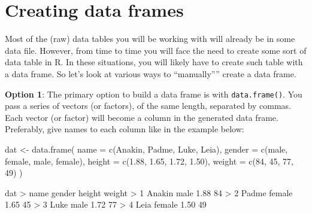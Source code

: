\documentclass[
]{book}
\newenvironment{Shaded}{\begin{snugshade}}{\end{snugshade}}
\newcommand{\AttributeTok}[1]{\textcolor[rgb]{0.77,0.63,0.00}{#1}}
\newcommand{\DecValTok}[1]{\textcolor[rgb]{0.00,0.00,0.81}{#1}}
\newcommand{\FloatTok}[1]{\textcolor[rgb]{0.00,0.00,0.81}{#1}}
\newcommand{\FunctionTok}[1]{\textcolor[rgb]{0.00,0.00,0.00}{#1}}
\newcommand{\NormalTok}[1]{#1}
\newcommand{\OtherTok}[1]{\textcolor[rgb]{0.56,0.35,0.01}{#1}}
\newcommand{\SpecialCharTok}[1]{\textcolor[rgb]{0.00,0.00,0.00}{#1}}
\newcommand{\StringTok}[1]{\textcolor[rgb]{0.31,0.60,0.02}{#1}}
\begin{document}
\hypertarget{creating-data-frames}{%
\section{Creating data frames}\label{creating-data-frames}}

Most of the (raw) data tables you will be working with will already be in
some data file. However, from time to time you will face the need to create
some sort of data table in R. In these situations, you will likely have to
create such table with a data frame. So let's look at various ways to
``manually'''' create a data frame.

\textbf{Option 1}: The primary option to build a data frame is with \texttt{data.frame()}.
You pass a series of vectors (or factors), of the same length, separated by commas.
Each vector (or factor) will become a column in the generated data frame.
Preferably, give names to each column like in the example below:

\begin{Shaded}
\begin{Highlighting}[]
\NormalTok{dat }\OtherTok{\textless{}{-}} \FunctionTok{data.frame}\NormalTok{(}
  \AttributeTok{name =} \FunctionTok{c}\NormalTok{(}\StringTok{\textquotesingle{}Anakin\textquotesingle{}}\NormalTok{, }\StringTok{\textquotesingle{}Padme\textquotesingle{}}\NormalTok{, }\StringTok{\textquotesingle{}Luke\textquotesingle{}}\NormalTok{, }\StringTok{\textquotesingle{}Leia\textquotesingle{}}\NormalTok{),}
  \AttributeTok{gender =} \FunctionTok{c}\NormalTok{(}\StringTok{\textquotesingle{}male\textquotesingle{}}\NormalTok{, }\StringTok{\textquotesingle{}female\textquotesingle{}}\NormalTok{, }\StringTok{\textquotesingle{}male\textquotesingle{}}\NormalTok{, }\StringTok{\textquotesingle{}female\textquotesingle{}}\NormalTok{),}
  \AttributeTok{height =} \FunctionTok{c}\NormalTok{(}\FloatTok{1.88}\NormalTok{, }\FloatTok{1.65}\NormalTok{, }\FloatTok{1.72}\NormalTok{, }\FloatTok{1.50}\NormalTok{),}
  \AttributeTok{weight =} \FunctionTok{c}\NormalTok{(}\DecValTok{84}\NormalTok{, }\DecValTok{45}\NormalTok{, }\DecValTok{77}\NormalTok{, }\DecValTok{49}\NormalTok{)}
\NormalTok{) }

\NormalTok{dat}
\SpecialCharTok{\textgreater{}}\NormalTok{     name gender height weight}
\SpecialCharTok{\textgreater{}} \DecValTok{1}\NormalTok{ Anakin   male   }\FloatTok{1.88}     \DecValTok{84}
\SpecialCharTok{\textgreater{}} \DecValTok{2}\NormalTok{  Padme female   }\FloatTok{1.65}     \DecValTok{45}
\SpecialCharTok{\textgreater{}} \DecValTok{3}\NormalTok{   Luke   male   }\FloatTok{1.72}     \DecValTok{77}
\SpecialCharTok{\textgreater{}} \DecValTok{4}\NormalTok{   Leia female   }\FloatTok{1.50}     \DecValTok{49}
\end{Highlighting}
\end{Shaded}
\end{document}
